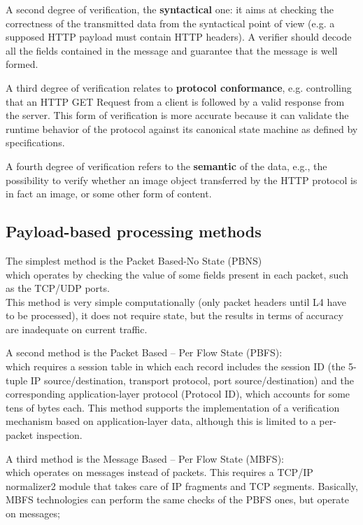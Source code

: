 \documentclass{article}
\begin{document}
A second degree of verification, the \textbf{syntactical} one: it aims at checking the correctness of the transmitted data from the syntactical point of 
view (e.g. a supposed HTTP payload must contain HTTP headers). 
A verifier should decode all the fields contained in the message and guarantee that the message is well formed.

A third degree of verification relates to \textbf{protocol conformance},
e.g. controlling that an HTTP GET Request from a client is followed by a valid response from the server. 
This form of verification is more accurate because it can validate the runtime behavior of the protocol against its canonical state machine as defined by specifications. 

A fourth degree of verification refers to the \textbf{semantic} of the data, e.g., the possibility to verify whether an image object transferred by the HTTP protocol is in fact an image, or some other form of content.

\subsection{Payload-based processing methods}
The simplest method is the Packet Based-No State (PBNS)\\
which operates by checking the value of some fields present in each packet, such as the TCP/UDP ports. \\
This method is very simple computationally (only packet headers until L4 have to be processed), 
it does not require state, but the results in terms of accuracy are inadequate on current traffic. 

A second method is the Packet Based – Per Flow State (PBFS):\\ 
which requires a session table in which each record includes the session ID (the 5-tuple IP source/destination, transport protocol, port source/destination) 
and the corresponding application-layer protocol (Protocol ID), which accounts for some tens of bytes each. 
This method supports the implementation of a verification mechanism based on application-layer data, although this is limited to a per-packet inspection.

A third method is the Message Based – Per Flow State (MBFS):\\
which operates on messages instead of packets. This requires a TCP/IP normalizer2 module that takes care of IP fragments and TCP segments. 
Basically, MBFS technologies can perform the same checks of the PBFS ones, but operate on messages;
\end{document}
